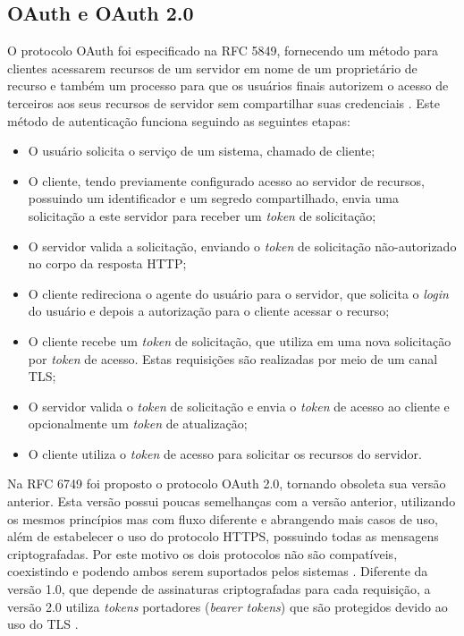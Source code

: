 \subsection{OAuth e OAuth 2.0}

O protocolo OAuth foi especificado na RFC 5849, fornecendo um método para clientes acessarem 
recursos de um servidor em nome de um proprietário de recurso e também um processo para que os 
usuários finais autorizem o acesso de terceiros aos seus recursos de servidor sem compartilhar suas
credenciais \cite{RFC5849}. Este método de autenticação funciona seguindo as seguintes etapas:

\begin{itemize}
\item O usuário solicita o serviço de um sistema, chamado de cliente;
\item O cliente, tendo previamente configurado acesso ao servidor de recursos, possuindo um 
identificador e um segredo compartilhado, envia uma solicitação a este servidor para receber um 
\emph{token} de solicitação;
\item O servidor valida a solicitação, enviando o \emph{token} de solicitação não-autorizado no 
corpo da resposta HTTP;
\item O cliente redireciona o agente do usuário para o servidor, que solicita o \emph{login} do 
usuário e depois a autorização para o cliente acessar o recurso;
\item O cliente recebe um \emph{token} de solicitação, que utiliza em uma nova solicitação por 
\emph{token} de acesso. Estas requisições são realizadas por meio de um canal TLS;
\item O servidor valida o \emph{token} de solicitação e envia o \emph{token} de acesso ao cliente e 
opcionalmente um \emph{token} de atualização;
\item O cliente utiliza o \emph{token} de acesso para solicitar os recursos do servidor.
\end{itemize}

Na RFC 6749 foi proposto o protocolo OAuth 2.0, tornando obsoleta sua versão anterior. Esta versão possui 
poucas semelhanças com a versão anterior, utilizando os mesmos princípios mas com fluxo diferente e 
abrangendo mais casos de uso, além de estabelecer o uso do protocolo HTTPS, possuindo todas as mensagens 
criptografadas. Por este motivo os dois protocolos não são compatíveis, coexistindo e podendo ambos serem 
suportados pelos sistemas \cite{RFC6749}. Diferente da versão 1.0, que depende de assinaturas 
criptografadas para cada requisição, a versão 2.0 utiliza \emph{tokens} portadores (\emph{bearer tokens}) 
que são protegidos devido ao uso do TLS \cite{SIRIWARDENA2014}. 

